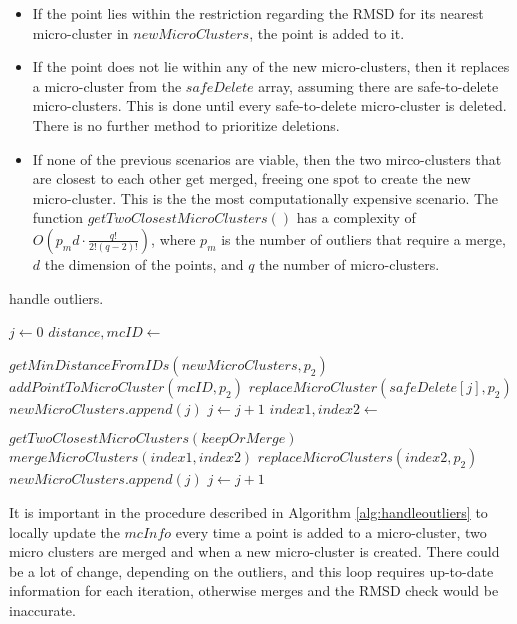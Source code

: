 \begin{itemize}
 \item If the point lies within the restriction regarding the RMSD for its nearest micro-cluster in $newMicroClusters$, the point is added to it.
 \item If the point does not lie within any of the new micro-clusters, then it replaces a micro-cluster from the $safeDelete$ array, assuming there are safe-to-delete micro-clusters. This is done until every safe-to-delete micro-cluster is deleted. There is no further method to prioritize deletions.
 \item If none of the previous scenarios are viable, then the two mirco-clusters that are closest to each other get merged, freeing one spot to create the new micro-cluster. This is the the most computationally expensive scenario. The function $getTwoClosestMicroClusters()$ has a complexity of $O(p_{m}d\cdot \frac{q!}{2!(q-2)!})$, where $p_m$ is the number of outliers that require a merge, $d$ the dimension of the points, and $q$ the number of micro-clusters.
\end{itemize}


\begin{algorithm}[h]
 \caption{handle outliers.}\label{alg:handleoutliers}
 \begin{algorithmic}[1]

  \vspace{10pt}
  \State $ j \gets 0$
  \State $distance,mcID \gets $
  \item[] $getMinDistanceFromIDs(newMicroClusters,p_2)$
  \State $addPointToMicroCluster(mcID,p_2)$
  \Else {}
  \State $replaceMicroCluster(safeDelete[j],p_2)$
  \State $newMicroClusters.append(j)$
  \State $j \gets j + 1$
  \Else
  \State $index1,index2 \gets $
  \item[] $getTwoClosestMicroClusters(keepOrMerge)$
  \State $mergeMicroClusters(index1,index2)$
  \State $replaceMicroClusters(index2,p_2)$
  \State $newMicroClusters.append(j)$
  \State $j \gets j + 1$
  \EndIf
  \EndIf
  \EndFor
 \end{algorithmic}
\end{algorithm}

It is important in the procedure described in Algorithm \ref{alg:handleoutliers} to locally update the $mcInfo$ every time a point is added to a micro-cluster, two micro clusters are merged and when a new micro-cluster is created. There could be a lot of change, depending on the outliers, and this loop requires up-to-date information for each iteration, otherwise merges and the RMSD check would be inaccurate.


